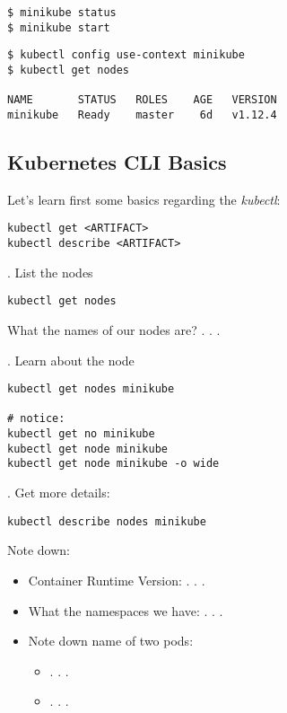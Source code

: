 \documentclass[12pt, letterpaper]{article}
\begin{document}
\begin{verbatim}
$ minikube status
$ minikube start
\end{verbatim}

\begin{verbatim}
$ kubectl config use-context minikube
$ kubectl get nodes

NAME       STATUS   ROLES    AGE   VERSION
minikube   Ready    master    6d   v1.12.4
\end{verbatim}


\subsection{Kubernetes CLI Basics}

Let's learn first some basics regarding the \textit{kubectl}:

\begin{verbatim}
kubectl get <ARTIFACT>
kubectl describe <ARTIFACT>
\end{verbatim}

. List the nodes

\begin{verbatim}
kubectl get nodes
\end{verbatim}

What the names of our nodes are? . . .

. Learn about the node

\begin{verbatim}
kubectl get nodes minikube

# notice:
kubectl get no minikube
kubectl get node minikube
kubectl get node minikube -o wide
\end{verbatim}

. Get more details: 

\begin{lstlisting}
kubectl describe nodes minikube
\end{lstlisting}

Note down:
\begin{itemize}
    \item Container Runtime Version: . . .
    \item  What the namespaces we have: . . .
    \item  Note down name of two pods:\begin{itemize}
        \item . . .
        \item . . .
     \end{itemize}
\end{itemize}
\end{document}
